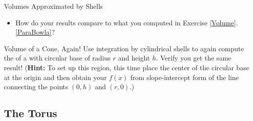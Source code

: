 \begin{exercise}{Volumes Approximated by Shells \Coffeecup \Coffeecup}
\begin{itemize}

\item  How do your results compare to what you computed in Exercise \ref{Volume}.\ref{ParaBowla}? 

\end{itemize}
\end{exercise}

\begin{exercise}{Volume of a Cone, Again! \Coffeecup \Coffeecup} Use integration by cylindrical shells to again compute the  of a  with circular base of radius $r$ and height $h$.  Verify you get the same result!  ({\bf Hint:} To set up this region, this time place the center of the circular base at the origin and then obtain your $f(x)$ from slope-intercept form of the line  connecting the points $(0,h)$ and $(r,0)$.)
\end{exercise}


\subsection{The Torus}\label{Ford}

